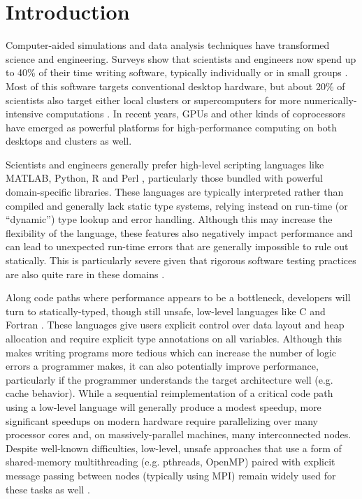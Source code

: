 \documentclass{llncs}
\begin{document}
\section{Introduction}
Computer-aided simulations and data analysis techniques have transformed science and engineering. Surveys show that scientists and engineers now spend up to 40\% of their time writing software, typically individually or in small groups \cite{howison2011scientific}\cite{hannay2009scientists}. Most of this software targets conventional desktop hardware, but about 20\% of scientists also target either local clusters or super\-computers for more numerically-intensive computations \cite{hannay2009scientists}. In recent years, GPUs and other kinds of coprocessors have emerged as powerful platforms for high-performance computing on both desktops and clusters as well.

Scientists and engineers generally prefer high-level scripting languages like MATLAB, Python, R and Perl \cite{nguyen2010survey}, particularly those bundled with powerful domain-specific libraries. These languages are typically interpreted rather than compiled and generally lack static type systems, relying instead on run-time (or ``dynamic'') type lookup and error handling. Although this may increase the flexibility of the language, these features also negatively impact performance and can lead to unexpected run-time errors that are generally impossible to rule out statically. This is particularly severe given that rigorous software testing practices are also quite rare in these domains \cite{nguyen2010survey}.

Along code paths where performance appears to be a bottleneck, developers will turn to statically-typed, though still unsafe, low-level languages like C and Fortran \cite{4222616}. These languages give users explicit control over data layout and heap allocation and require explicit type annotations on all variables. Although this makes writing programs more tedious which can increase the number of logic errors a programmer makes, it can also potentially improve performance, particularly if the programmer understands the target architecture well (e.g. cache behavior). While a sequential reimplementation of a critical code path using a low-level language will generally produce a modest speedup, more significant speedups on modern hardware require parallelizing over many processor cores and, on massively-parallel machines, many interconnected nodes. Despite well-known difficulties, low-level, unsafe  approaches that use a form of shared-memory  multithreading (e.g. pthreads, OpenMP) paired with explicit message passing between nodes (typically using MPI) remain widely used for these tasks as well \cite{4222616}\cite{basili2008understanding}. 
\end{document}
